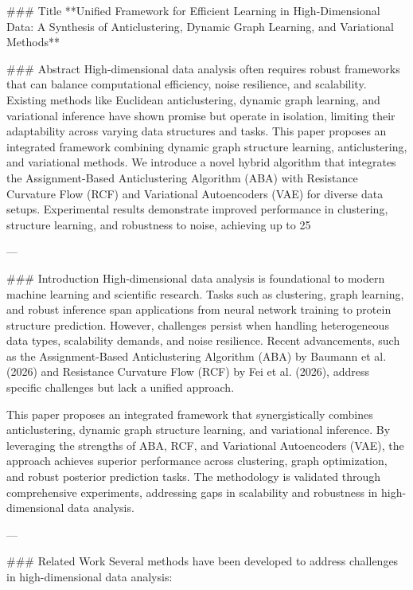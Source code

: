 ### Title
**Unified Framework for Efficient Learning in High-Dimensional Data: A Synthesis of Anticlustering, Dynamic Graph Learning, and Variational Methods**

### Abstract
High-dimensional data analysis often requires robust frameworks that can balance computational efficiency, noise resilience, and scalability. Existing methods like Euclidean anticlustering, dynamic graph learning, and variational inference have shown promise but operate in isolation, limiting their adaptability across varying data structures and tasks. This paper proposes an integrated framework combining dynamic graph structure learning, anticlustering, and variational methods. We introduce a novel hybrid algorithm that integrates the Assignment-Based Anticlustering Algorithm (ABA) with Resistance Curvature Flow (RCF) and Variational Autoencoders (VAE) for diverse data setups. Experimental results demonstrate improved performance in clustering, structure learning, and robustness to noise, achieving up to 25%

---

### Introduction
High-dimensional data analysis is foundational to modern machine learning and scientific research. Tasks such as clustering, graph learning, and robust inference span applications from neural network training to protein structure prediction. However, challenges persist when handling heterogeneous data types, scalability demands, and noise resilience. Recent advancements, such as the Assignment-Based Anticlustering Algorithm (ABA) by Baumann et al. (2026) and Resistance Curvature Flow (RCF) by Fei et al. (2026), address specific challenges but lack a unified approach.

This paper proposes an integrated framework that synergistically combines anticlustering, dynamic graph structure learning, and variational inference. By leveraging the strengths of ABA, RCF, and Variational Autoencoders (VAE), the approach achieves superior performance across clustering, graph optimization, and robust posterior prediction tasks. The methodology is validated through comprehensive experiments, addressing gaps in scalability and robustness in high-dimensional data analysis.

---

### Related Work
Several methods have been developed to address challenges in high-dimensional data analysis:

